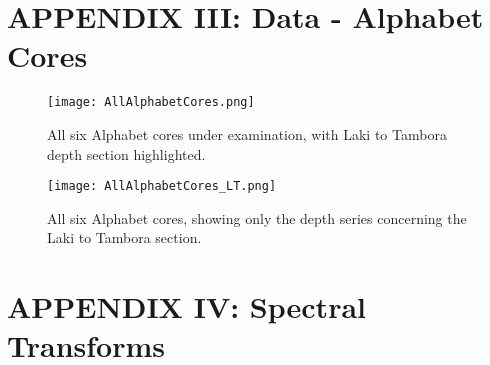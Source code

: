 \documentclass[../../CompleteThesis2/Complete_2ndDraft.tex]{subfiles}
\begin{document}
	
	
	\newpage
	\section[Appendix III]{APPENDIX III: Data - Alphabet Cores}
	\label{AppIII:Data_Alphabet}
	\begin{figure}[h]
		\centering
		\texttt{[image: AllAlphabetCores.png]}
		\caption[]{All six Alphabet cores under examination, with Laki to Tambora depth section highlighted.}
		\label{fig:AllAlphabetCores}
	\end{figure}
	
	\begin{figure}[H]
		\centering
		\texttt{[image: AllAlphabetCores\_LT.png]}
		\caption[]{All six Alphabet cores, showing only the depth series concerning the Laki to Tambora section.}
		\label{fig:AllAlphabetCores_LT}
	\end{figure}
	\newpage
	
	
	\newpage
	\section[Appendix IV]{APPENDIX IV: Spectral Transforms}
	\label{AppIV:SpectralTransforms}		
\end{document}
